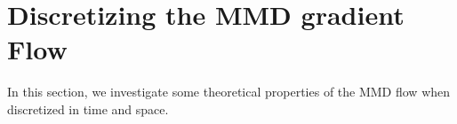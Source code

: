 \section{Discretizing the MMD gradient Flow}\label{sec:discretized_flow}

In this section, we investigate some theoretical properties of the MMD flow when discretized in time and space.



